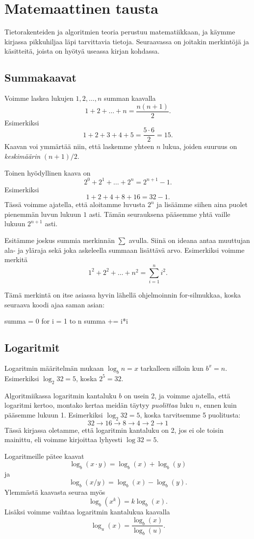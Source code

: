 \section{Matemaattinen tausta}

Tietorakenteiden ja algoritmien teoria perustuu matematiikkaan,
ja käym\-me kirjassa pikkuhiljaa läpi tarvittavia tietoja.
Seuraavassa on joitakin merkintöjä ja käsitteitä, joista on hyötyä
useassa kirjan kohdassa.

\subsection{Summakaavat}

Voimme laskea lukujen $1,2,\dots,n$ summan kaavalla
\[1+2+\dots+n = \frac{n(n+1)}{2}.\]
Esimerkiksi
\[1+2+3+4+5 = \frac{5 \cdot 6}{2}=15.\]
Kaavan voi ymmärtää niin, että laskemme yhteen $n$ lukua,
joiden suuruus on \emph{keskimäärin} $(n+1)/2$.

Toinen hyödyllinen kaava on
\[2^0+2^1+\dots+2^n = 2^{n+1}-1.\]
Esimerkiksi
\[1+2+4+8+16=32-1.\]
Tässä voimme ajatella, että aloitamme luvusta $2^n$
ja lisäämme siihen aina puolet pienemmän luvun lukuun $1$ asti.
Tämän seurauksena pääsemme yhtä vaille lukuun $2^{n+1}$ asti.

Esitämme joskus summia merkinnän $\sum$ avulla.
Siinä on ideana antaa muuttujan ala- ja yläraja sekä
joka askeleella summaan lisättävä arvo.
Esimerkiksi voimme merkitä
\[1^2 + 2^2 + \dots + n^2 = \sum_{i=1}^n i^2.\]

Tämä merkintä on itse asiassa hyvin lähellä ohjelmoinnin
for-silmukkaa, koska seuraava koodi ajaa saman asian:

\begin{code}
summa = 0
for i = 1 to n
    summa += i*i
\end{code}

\subsection{Logaritmit}

Logaritmin määritelmän mukaan $\log_b n =x$
tarkalleen silloin kun $b^x=n$.
Esimerkiksi $\log_2 32=5$, koska $2^5=32$.

Algoritmiikassa logaritmin kantaluku $b$ on usein 2,
ja voimme ajatella, että logaritmi kertoo, montako kertaa
meidän täytyy \emph{puolittaa} luku $n$, ennen kuin pääsemme lukuun 1.
Esimerkiksi $\log_2 32 =5$, koska tarvitsemme 5 puolitusta:
\[32 \rightarrow 16 \rightarrow 8 \rightarrow 4 \rightarrow 2 \rightarrow 1\]
Tässä kirjassa oletamme, että logaritmin kantaluku on 2,
jos ei ole toisin mainittu,
eli voimme kirjoittaa lyhyesti $\log 32 = 5$.

Logaritmeille pätee kaavat
\[\log_b(x \cdot y) = \log_b(x)+\log_b(y)\]
ja
\[\log_b(x / y) = \log_b(x)-\log_b(y).\]
Ylemmästä kaavasta seuraa myös
\[\log_b(x^k) = k \log_b(x).\]
Lisäksi voimme vaihtaa logaritmin kantalukua kaavalla
\[\log_u(x) = \frac{\log_b(x)}{\log_b(u)}.\]
